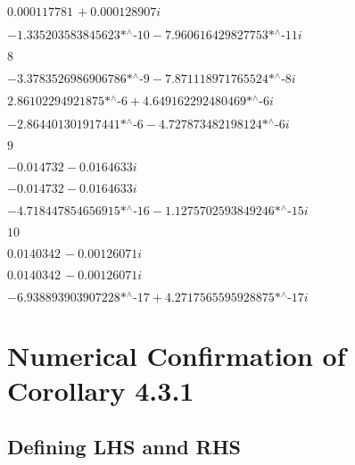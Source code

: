 \noindent\(0.000117781\, +0.000128907 i\)

\noindent\(-\text{1.335203583845623$\grave{ }$*${}^{\wedge}$-10}-\text{7.960616429827753$\grave{ }$*${}^{\wedge}$-11} i\)

\noindent\(8\)

\noindent\(-\text{3.3783526986906786$\grave{ }$*${}^{\wedge}$-9}-\text{7.871118971765524$\grave{ }$*${}^{\wedge}$-8} i\)

\noindent\(\text{2.86102294921875$\grave{ }$*${}^{\wedge}$-6}+\text{4.649162292480469$\grave{ }$*${}^{\wedge}$-6} i\)

\noindent\(-\text{2.864401301917441$\grave{ }$*${}^{\wedge}$-6}-\text{4.727873482198124$\grave{ }$*${}^{\wedge}$-6} i\)

\noindent\(9\)

\noindent\(-0.014732-0.0164633 i\)

\noindent\(-0.014732-0.0164633 i\)

\noindent\(-\text{4.718447854656915$\grave{ }$*${}^{\wedge}$-16}-\text{1.1275702593849246$\grave{ }$*${}^{\wedge}$-15} i\)

\noindent\(10\)

\noindent\(0.0140342\, -0.00126071 i\)

\noindent\(0.0140342\, -0.00126071 i\)

\noindent\(-\text{6.938893903907228$\grave{ }$*${}^{\wedge}$-17}+\text{4.2717565595928875$\grave{ }$*${}^{\wedge}$-17} i\)

\section*{Numerical Confirmation of Corollary 4.3.1}

\subsection*{Defining LHS annd RHS}

